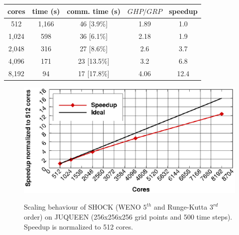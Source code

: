 \begin{table}[H]
\centering
\begin{tabular}{c|c|c|c|c}
\textbf{cores} & \textbf{time (s)} & \textbf{comm. time (s)} & $GHP/GRP$ & \textbf{speedup}\\ 
\hline 
512 & 1,166 & 46 [3.9\%]& 1.89 & 1.0\\
1,024 & 598 & 36 [6.1\%]& 2.18 & 1.9\\
2,048 & 316 & 27 [8.6\%]& 2.6 & 3.7\\
4,096 & 171 & 23 [13.5\%]& 3.2 & 6.8\\
8,192 & 94 & 17 [17.8\%]& 4.06 & 12.4\\ 
\end{tabular} 
\end{table}

\begin{figure}[H]
\centering
{\includegraphics[width = 0.7\linewidth]{scale.eps}}
\caption{Scaling behaviour of SHOCK (WENO $5^{th}$ and Runge-Kutta $3^{rd}$ order) on JUQUEEN (256x256x256 grid points and 500 time steps). Speedup is normalized to 512 cores.}
\label{scale}
\end{figure}
